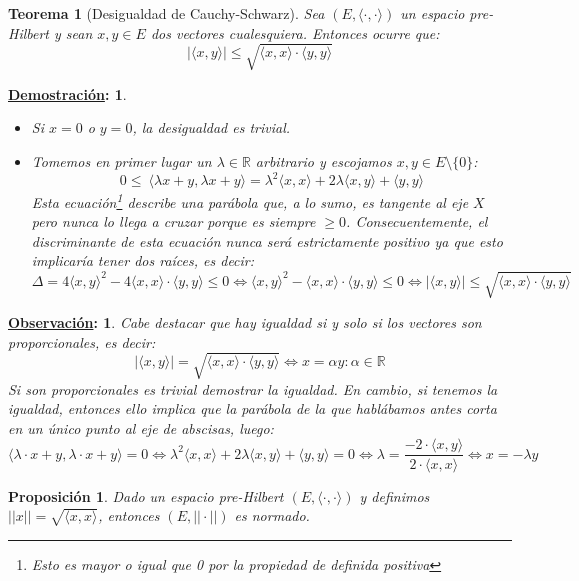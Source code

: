 \documentclass[10pt,a4paper,openright]{book}
\theoremstyle{break}
\newtheorem*{theo}{Teorema}
\newtheorem*{prop}{Proposición}
\newtheorem*{demo}{\underline{Demostración}:}
\newtheorem*{obs}{\underline{Observación}:}
\begin{document}
\begin{theo}[Desigualdad de Cauchy-Schwarz]
Sea $(E, \langle\cdot, \cdot\rangle)$ un espacio pre-Hilbert y sean $x,y \in E$ dos vectores cualesquiera. Entonces ocurre que:
$$|\langle x,y\rangle| \leq \sqrt{\langle x,x \rangle \cdot \langle y,y\rangle}$$
\end{theo}

\begin{demo}
\begin{itemize}
\item Si $x = 0$ o $y=0$, la desigualdad es trivial.

\item Tomemos en primer lugar un $\lambda\in \mathbb R$ arbitrario y escojamos $x,y \in E \setminus \{0\}$:
$$0 \leq \ \langle \lambda x + y, \lambda x + y\rangle = \lambda^2 \langle x,x\rangle + 2\lambda \langle x,y\rangle + \langle y,y\rangle$$
Esta ecuación\footnote{Esto es mayor o igual que 0 por la propiedad de definida positiva} describe una parábola que, a lo sumo, es tangente al eje $X$ pero nunca lo llega a cruzar porque es siempre $\geq 0$. Consecuentemente, el discriminante de esta ecuación nunca será estrictamente positivo ya que esto implicaría tener dos raíces, es decir:
$$\Delta = 4 \langle x,y\rangle^2 - 4\langle x,x\rangle\cdot \langle y,y\rangle \leq 0 \Leftrightarrow \langle x,y\rangle^2 -\langle x,x\rangle\cdot \langle y,y\rangle \leq 0 \Leftrightarrow|\langle x,y\rangle| \leq \sqrt{\langle x,x\rangle\cdot\langle y,y\rangle}$$
\end{itemize}
\end{demo}

\begin{obs}
Cabe destacar que hay igualdad si y solo si los vectores son proporcionales, es decir:
$$|\langle x,y\rangle| =\sqrt{\langle x,x\rangle \cdot \langle y,y\rangle} \Leftrightarrow x = \alpha y : \alpha \in \mathbb{R}$$
Si son proporcionales es trivial demostrar la igualdad. En cambio, si tenemos la igualdad, entonces ello implica que la parábola de la que hablábamos antes corta en un único punto al eje de abscisas, luego:
$$\langle\lambda \cdot x + y, \lambda \cdot x + y\rangle =  0\Leftrightarrow  \lambda^2 \langle x,x\rangle + 2\lambda \langle x,y\rangle + \langle y,y\rangle = 0 \Leftrightarrow \lambda = \frac{-2 \cdot \langle x,y\rangle}{2 \cdot \langle x,x\rangle} \Leftrightarrow x = -\lambda y$$
\end{obs}

\begin{prop}
Dado un espacio pre-Hilbert $(E, \langle \cdot, \cdot \rangle)$ y definimos $||x|| = \sqrt{\langle x,x \rangle}$, entonces $(E, || \cdot ||)$ es normado.
\end{prop}
\end{document}
